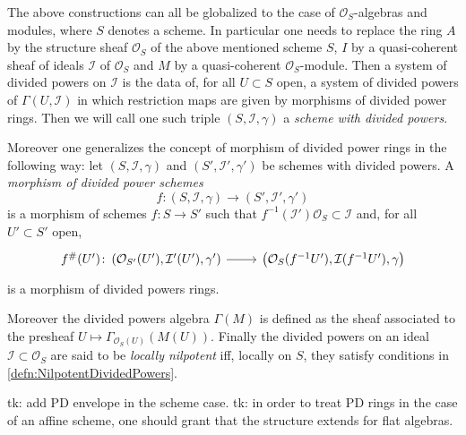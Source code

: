 \documentclass[../Main]{subfiles}
\begin{document}
\begin{rem}[]\label{rem:DividedPowersSheaf}
	The above constructions can all be globalized to the case of
	$\mathcal{O}_S$-algebras and modules, where $S$ denotes a scheme.
	In particular one needs to replace the ring $A$ by the 
	structure sheaf $\mathcal{O}_{ S }$ of the above mentioned scheme $S$,
	$I$ by a quasi-coherent sheaf of ideals $\mathcal{I}$ of $\mathcal{O}_S$ and
	$M$ by a quasi-coherent $\mathcal{O}_S$-module.
	Then a system of divided powers on $\mathcal{I}$ is the data
	of, for all $U \subset S$ open, a system of divided powers of
	$\Gamma(U,\mathcal{I})$ in which restriction maps
	are given by morphisms of divided power rings.
	Then we will call one such triple $\left(S, \mathcal{I}, \gamma\right)$
	a {\em scheme with divided powers}.

	Moreover one generalizes the concept of morphism of divided 
	power rings in the following way:
	let $\left(S, \mathcal{I}, \gamma\right)$ and $\left(S', \mathcal{I}', \gamma'\right)$
	be schemes with divided powers.
	A {\em morphism of divided power schemes}
	\begin{equation*}
	f\colon \left(S, \mathcal{I}, \gamma\right) \to 
	\left(S', \mathcal{I}', \gamma'\right)
	\end{equation*}
	is a morphism of schemes
	$f\colon S \to S'$ such that
	$f^{-1}(\mathcal{I}') \mathcal{O}_S \subset \mathcal{I}$
	and, for all $U' \subset S'$ open,
	\begin{equation*}
	\begin{tikzcd}[row sep = 0ex
		,/tikz/column 1/.append style={anchor=base east}
		,/tikz/column 2/.append style={anchor=base west}]
		f^\#(U')\colon 
		\left(\mathcal{O}_{S'}(U'), \mathcal{I}'(U'), \gamma'\right)
		\arrow[r, "", rightarrow] &
		\left(\mathcal{O}_{ S }(f^{-1}U'), \mathcal{I}(f^{-1}U'), \gamma\right)
	\end{tikzcd}
	\end{equation*} 
	is a morphism of divided powers rings.

	Moreover the divided powers algebra $\Gamma(M)$ is defined
	as the sheaf associated to the presheaf 
	$U \mapsto \Gamma_{\mathcal{O}_S(U)}(M(U))$.
	Finally the divided powers on an ideal $\mathcal{I} \subset \mathcal{O}_S$
	are said to be {\em locally nilpotent} iff,
	locally on $S$, they satisfy conditions in \cref{defn:NilpotentDividedPowers}.
\end{rem}
tk: add PD envelope in the scheme case.
tk: in order to treat PD rings in the case of an affine scheme, one should
grant that the structure extends for flat algebras.
\end{document}
